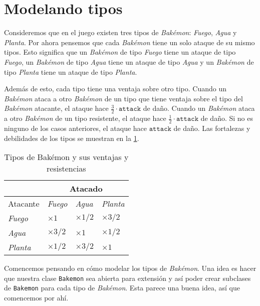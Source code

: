 \section{Modelando tipos}
  Consideremos que en el juego existen tres tipos de \textit{Bakémon}: \textit{Fuego},
  \textit{Agua} y \textit{Planta}.
  Por ahora pensemos que cada \textit{Bakémon} tiene un solo ataque de su mismo tipos.
  Esto significa que un \textit{Bakémon} de tipo \textit{Fuego} tiene un ataque de tipo
  \textit{Fuego}, un \textit{Bakémon} de tipo \textit{Agua} tiene un ataque de tipo
  \textit{Agua} y un \textit{Bakémon} de tipo \textit{Planta} tiene un ataque de tipo
  \textit{Planta}.

  Además de esto, cada tipo tiene una ventaja sobre otro tipo.
  Cuando un \textit{Bakémon} ataca a otro \textit{Bakémon} de un tipo que tiene ventaja
  sobre el tipo del \textit{Bakémon} atacante, el ataque hace 
  \(\frac{3}{2} \cdot \mathtt{attack}\) de daño.
  Cuando un \textit{Bakémon} ataca a otro \textit{Bakémon} de un tipo resistente, el ataque
  hace \(\frac{1}{2} \cdot \mathtt{attack}\) de daño.
  Si no es ninguno de los casos anteriores, el ataque hace \(\mathtt{attack}\) de daño.
  Las fortalezas y debilidades de los tipos se muestran en la \cref{tab:tipos}.

  \begin{table}[h]
    \centering
    \begin{tabular}{ |p{2cm}|p{2cm}|p{2cm}|p{2cm}|  }
      \hline
                & \multicolumn{3}{|c|}{Atacado} \\
      \hline
      Atacante  & \textit{Fuego}              & \textit{Agua}           & \textit{Planta} \\
      \hline
      \textit{Fuego}  & \(\times 1\)           & \(\times 1/2\)         & \(\times 3/2\) \\
      \hline
      \textit{Agua}   & \(\times 3/2\)         & \(\times 1\)           & \(\times 1/2\) \\
      \hline
      \textit{Planta} & \(\times 1/2\)         & \(\times 3/2\)         & \(\times 1\) \\
      \hline
      \end{tabular}
    \caption{Tipos de Bakémon y sus ventajas y resistencias}
    \label{tab:tipos}
  \end{table}

  Comencemos pensando en cómo modelar los tipos de \textit{Bakémon}.
  Una idea es hacer que nuestra clase \texttt{Bakemon} sea abierta para extensión y así poder
  crear subclases de \texttt{Bakemon} para cada tipo de \textit{Bakémon}.
  Esta parece una buena idea, así que comencemos por ahí.

